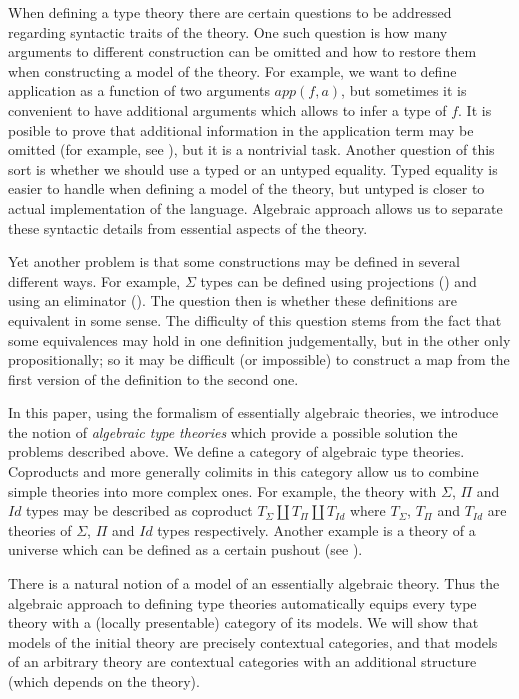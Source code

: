 \documentclass{amsart}
\theoremstyle{definition}
\theoremstyle{remark}
\numberwithin{figure}{section}
\begin{document}
When defining a type theory there are certain questions to be addressed regarding syntactic traits of the theory.
One such question is how many arguments to different construction can be omitted and how to restore them when constructing a model of the theory.
For example, we want to define application as a function of two arguments $app(f,a)$, but sometimes it is convenient to have additional arguments which allows to infer a type of $f$.
It is posible to prove that additional information in the application term may be omitted (for example, see \cite{streicher}), but it is a nontrivial task.
Another question of this sort is whether we should use a typed or an untyped equality.
Typed equality is easier to handle when defining a model of the theory, but untyped is closer to actual implementation of the language.
Algebraic approach allows us to separate these syntactic details from essential aspects of the theory.

Yet another problem is that some constructions may be defined in several different ways.
For example, $\Sigma$ types can be defined using projections () and using an eliminator ().
The question then is whether these definitions are equivalent in some sense.
The difficulty of this question stems from the fact that some equivalences may hold in one definition judgementally, but in the other only propositionally;
so it may be difficult (or impossible) to construct a map from the first version of the definition to the second one.

In this paper, using the formalism of essentially algebraic theories, we introduce the notion of
\emph{algebraic type theories} which provide a possible solution the problems described above.
We define a category of algebraic type theories.
Coproducts and more generally colimits in this category allow us to combine simple theories into more complex ones.
For example, the theory with $\Sigma$, $\Pi$ and $Id$ types may be described as coproduct $T_\Sigma \amalg T_\Pi \amalg T_{Id}$
where $T_\Sigma$, $T_\Pi$ and $T_{Id}$ are theories of $\Sigma$, $\Pi$ and $Id$ types respectively.
Another example is a theory of a universe which can be defined as a certain pushout (see ).

There is a natural notion of a model of an essentially algebraic theory.
Thus the algebraic approach to defining type theories automatically equips every type theory with a (locally presentable) category of its models.
We will show that models of the initial theory are precisely contextual categories,
and that models of an arbitrary theory are contextual categories with an additional structure (which depends on the theory).
\end{document}
